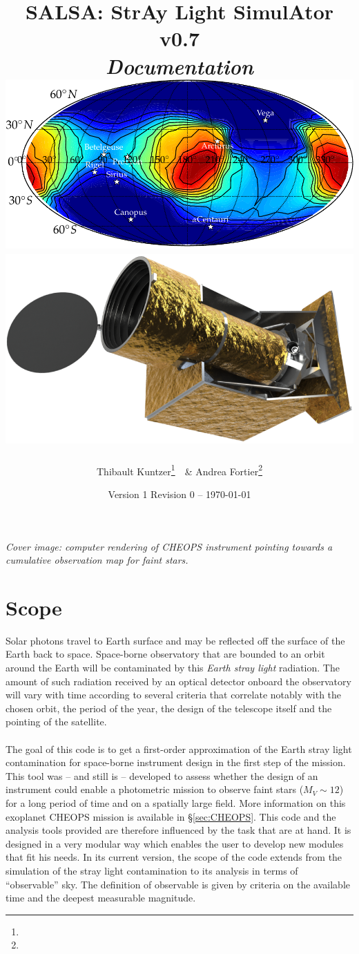 \documentclass[a4paper,10pt]{article}
\title{\textbf{SALSA: StrAy Light SimulAtor v0.7}\\\emph{Documentation}
\vspace{2cm}\\
  \includegraphics[width=0.6\linewidth]{700_50_mag_125_SAA}
    \includegraphics[width=0.2\linewidth]{instrument_large_rot.png}
  \vspace{2cm}\\
}
\author{Thibault Kuntzer\footnote{\mail{thibault.kuntzer@epfl.ch}}\ \ \& Andrea Fortier\footnote{\mail{andrea.fortier@space.unibe.ch}}}
\date{Version 1 Revision 0 -- \today}
\begin{document}
\maketitle


\clearpage

\emph{Cover image: computer rendering of CHEOPS instrument pointing towards a cumulative observation map for faint stars.}
\vspace{2em}
\tableofcontents


\section{Scope} \label{sec:scope}
Solar photons travel to Earth surface and may be reflected off the surface of the Earth back to space. Space-borne observatory that are bounded to an orbit around the Earth will be contaminated by this \emph{Earth stray light} radiation. The amount of such radiation received by an optical detector onboard the observatory will vary with time according to several criteria that correlate notably with the chosen orbit, the period of the year, the design of the telescope itself and the pointing of the satellite. 
\paragraph{}
The goal of this code is to get a first-order approximation of the Earth stray light contamination for space-borne instrument design in the first step of the mission. This tool was -- and still is -- developed to assess whether the design of an instrument could enable a photometric mission to observe faint stars ($M_V\sim12$) for a long period of time and on a spatially large field. 
More information on this exoplanet CHEOPS mission is available in \S\ref{sec:CHEOPS}. This code and the analysis tools provided are therefore influenced by the task that are at hand. It is designed in a very modular way which enables the user to develop new modules that fit his needs. 
In its current version, the scope of the code extends from the simulation of the stray light contamination to its analysis in terms of ``observable'' sky. The definition of observable is given by criteria on the available time and the deepest measurable magnitude.
\end{document}
